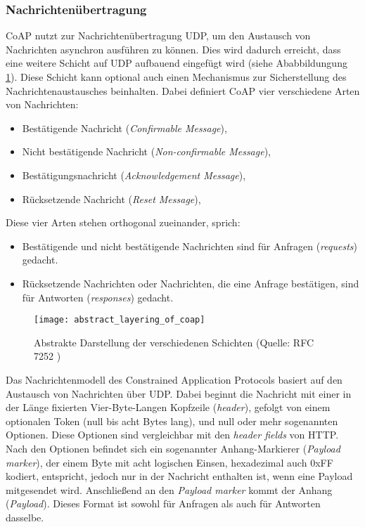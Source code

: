 \subsubsection{Nachrichtenübertragung}
\label{subsubsec:nachrichtenuebertragung}

CoAP nutzt zur Nachrichtenübertragung UDP, um den Austausch von Nachrichten asynchron ausführen zu können. Dies wird dadurch erreicht, dass eine weitere Schicht auf UDP aufbauend eingefügt wird (siehe Ababbildungung \ref{fig:abstrakte-darstellung-der-verschiedenen-schichten}). Diese Schicht kann optional auch einen Mechanismus zur Sicherstellung des Nachrichtenaustausches beinhalten. Dabei definiert CoAP vier verschiedene Arten von Nachrichten:
\begin{itemize}
    \item Bestätigende Nachricht (\textit{Confirmable Message}),
    \item Nicht bestätigende Nachricht (\textit{Non-confirmable Message}),
    \item Bestätigungsnachricht (\textit{Acknowledgement Message}),
    \item Rücksetzende Nachricht (\textit{Reset Message}),
\end{itemize}

Diese vier Arten stehen orthogonal zueinander, sprich:
\begin{itemize}
    \item Bestätigende und nicht bestätigende Nachrichten sind für Anfragen (\textit{requests}) gedacht.
    \item Rücksetzende Nachrichten oder Nachrichten, die eine Anfrage bestätigen, sind für Antworten (\textit{responses}) gedacht.
\end{itemize}

\begin{figure}[h]
    \centering
    \texttt{[image: abstract\_layering\_of\_coap]}
    \caption{Abstrakte Darstellung der verschiedenen Schichten (Quelle: RFC 7252 \autocite{RFC7252})}
    \label{fig:abstrakte-darstellung-der-verschiedenen-schichten}
\end{figure}

Das Nachrichtenmodell des Constrained Application Protocols basiert auf den Austausch von Nachrichten über UDP. Dabei beginnt die Nachricht mit einer in der Länge fixierten Vier-Byte-Langen Kopfzeile (\textit{header}), gefolgt von einem optionalen Token (null bis acht Bytes lang), und null oder mehr sogenannten Optionen. Diese Optionen sind vergleichbar mit den \textit{header fields} von HTTP. Nach den Optionen befindet sich ein sogenannter Anhang-Markierer (\textit{Payload marker}), der einem Byte mit acht logischen Einsen, hexadezimal auch 0xFF kodiert, entspricht, jedoch nur in der Nachricht enthalten ist, wenn eine Payload mitgesendet wird. Anschließend an den \textit{Payload marker} kommt der Anhang (\textit{Payload}). Dieses Format ist sowohl für Anfragen als auch für Antworten dasselbe.


